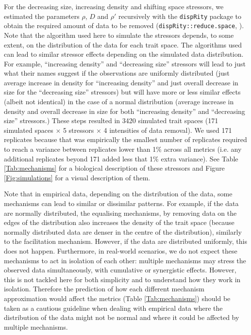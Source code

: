 \documentclass[12pt,letterpaper]{article}
\begin{document}
For the decreasing size, increasing density and shifting space stressors, we estimated the parameters $\rho$, $D$ and $\rho'$ recursively with the \texttt{dispRity} package to obtain the required amount of data to be removed (\texttt{dispRity::reduce.space}, \citealt{guillerme2018disprity,guillerme2020shifting}).
Note that the algorithm used here to simulate the stressors depends, to some extent, on the distribution of the data for each trait space.
The algorithms used can lead to similar stressor effects depending on the simulated data distribution.
For example, ``increasing density'' and ``decreasing size'' stressors will lead to just what their names suggest if the observations are uniformly distributed (just average increase in density for ``increasing density'' and just overall decrease in size for the ``decreasing size'' stressors) but will have more or less similar effects (albeit not identical) in the case of a normal distribution (average increase in density and overall decrease in size for both ``increasing density'' and ``decreasing size'' stressors.)
These steps resulted in 3420 simulated trait spaces (171 simulated spaces $\times$ 5 stressors $\times$ 4 intensities of data removal).
We used 171 replicates because that was empirically the smallest number of replicates required to reach a variance between replicates lower than 1\% across all metrics (i.e. any additional replicates beyond 171 added less that 1\% extra variance).
See Table \ref{Tab:mechanisms} for a biological description of these stressors and Figure \ref{Fig:simulations} for a visual description of them.

Note that in empirical data, depending on the distribution of the data, some mechanisms can lead to similar or dissimilar patterns.
For example, if the data are normally distributed, the equalising mechanisms, by removing data on the edges of the distribution also increases the density of the trait space (because normally distributed data are denser in the centre of the distribution), similarly to the facilitation mechanism.
However, if the data are distributed uniformly, this does not happen.
Furthermore, in real-world scenarios, we do not expect these mechanisms to act in isolation of each other: multiple mechanisms may stress the observed data simultaneously, with cumulative or synergistic effects.
However, this is not tackled here for both simplicity and to understand how they work in isolation. 
Therefore the prediction of how each different mechanism approximation would affect the metrics (Table \ref{Tab:mechanisms}) should be taken as a cautious guideline when dealing with empirical data where the distribution of the data might not be normal and where it could be affected by multiple mechanisms.
\end{document}
